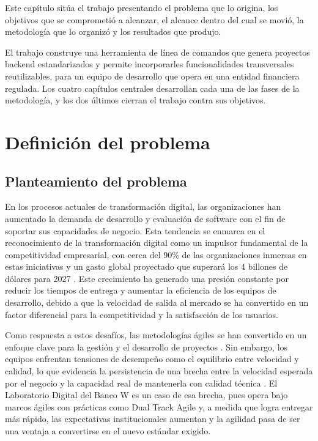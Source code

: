 
Este capítulo sitúa el trabajo presentando el problema que lo origina, los
objetivos que se comprometió a alcanzar, el alcance dentro del cual se movió,
la metodología que lo organizó y los resultados que produjo.

El trabajo construye una herramienta de línea de comandos que genera
proyectos backend estandarizados y permite incorporarles funcionalidades
transversales reutilizables, para un equipo de desarrollo que opera en una
entidad financiera regulada. Los cuatro capítulos centrales desarrollan cada
una de las fases de la metodología, y los dos últimos cierran el trabajo
contra sus objetivos.

\section{Definición del problema}

\subsection{Planteamiento del problema}
\label{sec:planteamiento}
En los procesos actuales de transformación digital, las organizaciones han aumentado la demanda de desarrollo y evaluación de software con el fin de soportar sus capacidades de negocio. Esta tendencia se enmarca en el reconocimiento de la transformación digital como un impulsor fundamental de la competitividad empresarial, con cerca del 90\% de las organizaciones inmersas en estas iniciativas y un gasto global proyectado que superará los 4 billones de dólares para 2027 \citep{Jie2025}. Este crecimiento ha generado una presión constante por reducir los tiempos de entrega y aumentar la eficiencia de los equipos de desarrollo, debido a que la velocidad de salida al mercado se ha convertido en un factor diferencial para la competitividad y la satisfacción de los usuarios.

Como respuesta a estos desafíos, las metodologías ágiles se han
convertido en un enfoque clave para la gestión y el desarrollo de
proyectos \citep{Palopak2024}. Sin embargo, los equipos enfrentan
tensiones de desempeño como el equilibrio entre velocidad y calidad, lo
que evidencia la persistencia de una brecha entre la velocidad esperada
por el negocio y la capacidad real de mantenerla con calidad técnica
\citep{Armbruster2025}. El Laboratorio Digital del Banco W
\citep{UniversidadIcesi2023} es un caso de esa brecha, pues opera bajo
marcos ágiles con prácticas como Dual Track Agile \citep{MartyCagan2012}
y, a medida que logra entregar más rápido, las expectativas
institucionales aumentan y la agilidad pasa de ser una ventaja a
convertirse en el nuevo estándar exigido.

